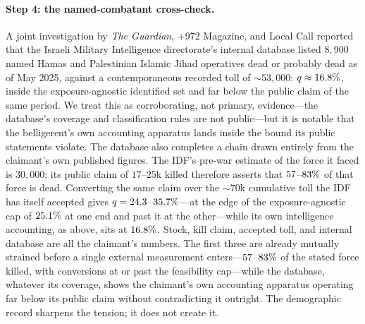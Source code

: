 \paragraph{Step 4: the named-combatant cross-check.} A joint investigation by \emph{The Guardian}, +972 Magazine, and Local Call \citep{guardian972db2025} reported that the Israeli Military Intelligence directorate's internal database listed $8{,}900$ named Hamas and Palestinian Islamic Jihad operatives dead or probably dead as of May 2025, against a contemporaneous recorded toll of ${\sim}53{,}000$: $q\approx 16.8{}\%$, inside the exposure-agnostic identified set and far below the public claim of the same period. We treat this as corroborating, not primary, evidence---the database's coverage and classification rules are not public---but it is notable that the belligerent's own accounting apparatus lands inside the bound its public statements violate. The database also completes a chain drawn entirely from the claimant's own published figures. The IDF's pre-war estimate of the force it faced is $30{,}000$; its public claim of $17$--$25$k killed therefore asserts that $57{}$--$83{}\%$ of that force is dead. Converting the same claim over the ${\sim}70$k cumulative toll the IDF has itself accepted gives $q=24.3{}$--$35.7{}\%$---at the edge of the exposure-agnostic cap of $25.1{}\%$ at one end and past it at the other---while its own intelligence accounting, as above, sits at $16.8{}\%$. Stock, kill claim, accepted toll, and internal database are all the claimant's numbers. The first three are already mutually strained before a single external measurement enters---$57{}$--$83{}\%$ of the stated force killed, with conversions at or past the feasibility cap---while the database, whatever its coverage, shows the claimant's own accounting apparatus operating far below its public claim without contradicting it outright. The demographic record sharpens the tension; it does not create it.

